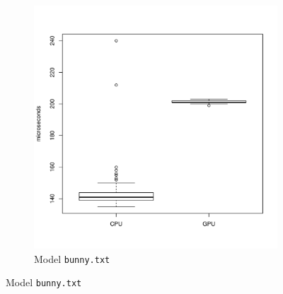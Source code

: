 \begin{figure}
		\begin{subfigure}[b]{0.45\textwidth}
			\includegraphics[width=\textwidth]{results/bunny}
			\caption{Model \texttt{bunny.txt}}
		\end{subfigure}
		\label{fig:results}
	\end{figure}
